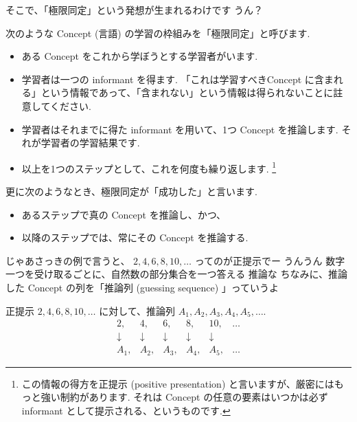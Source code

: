 \PAUSE

\YUZUKO そこで、「極限同定」という発想が生まれるわけです
\YUI うん？

\begin{boxnote}
    次のような Concept (言語) の学習の枠組みを「極限同定」と呼びます.
    \begin{itemize}
        \setlength{\itemsep}{-1mm}
        \item
            ある Concept をこれから学ぼうとする学習者がいます.
        \item
            学習者は一つの informant を得ます. 「これは学習すべきConcept に含まれる」という情報であって、「含まれない」という情報は得られないことに註意してください.
        \item
            学習者はそれまでに得た informant を用いて、1つ Concept を推論します.
            それが学習者の学習結果です.
        \item
            以上を1つのステップとして、これを何度も繰り返します. \footnote{この情報の得方を正提示 (positive presentation) と言いますが、厳密にはもっと強い制約があります. それは Concept の任意の要素はいつかは必ず informant として提示される、というものです.}
    \end{itemize}

    更に次のようなとき、極限同定が「成功した」と言います.
    \begin{itemize}
        \setlength{\itemsep}{-1mm}
        \item
            あるステップで真の Concept を推論し、かつ、
        \item
            以降のステップでは、常にその Concept を推論する.
    \end{itemize}
\end{boxnote}

\YUKARI じゃあさっきの例で言うと、
\YUKARI $2, 4, 6, 8, 10, \ldots$ ってのが正提示でー
\YUI うんうん
\YUKARI 数字一つを受け取るごとに、自然数の部分集合を一つ答える
\YUI 推論な
\YUZUKO ちなみに、推論した Concept の列を「推論列 (guessing sequence) 」っていうよ

\begin{boxnote}
    正提示 $2, 4, 6, 8, 10, \ldots$ に対して、推論列 $A_1, A_2, A_3, A_4, A_5, \ldots$.
\[
    \begin{array}{cccccc}
        2, & 4, & 6, & 8, & 10, & \ldots \\
        \downarrow & \downarrow & \downarrow & \downarrow & \downarrow & \\
        A_1, & A_2, & A_3, & A_4, & A_5, & \ldots
    \end{array}
\]
\end{boxnote}

